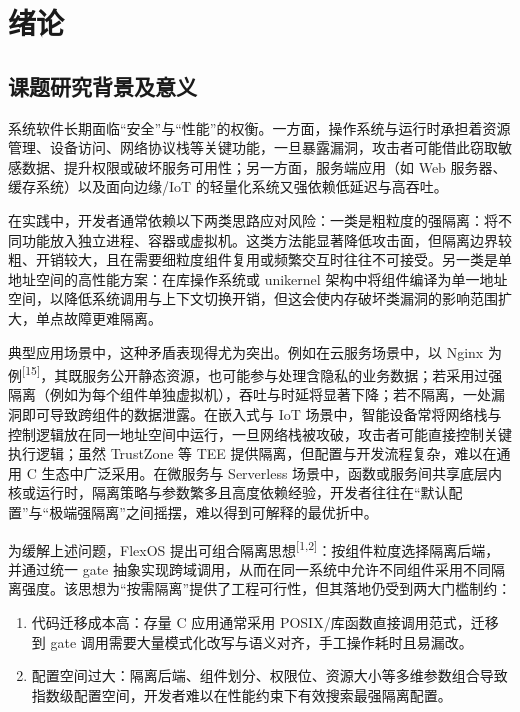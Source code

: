 \documentclass[UTF8,a4paper,12pt]{ctexart}
\numberwithin{equation}{section}
\begin{document}
\section{绪论}

\subsection{课题研究背景及意义}

系统软件长期面临``安全''与``性能''的权衡。一方面，操作系统与运行时承担着资源管理、设备访问、网络协议栈等关键功能，一旦暴露漏洞，攻击者可能借此窃取敏感数据、提升权限或破坏服务可用性；另一方面，服务端应用（如
Web 服务器、缓存系统）以及面向边缘/IoT
的轻量化系统又强依赖低延迟与高吞吐。

在实践中，开发者通常依赖以下两类思路应对风险：一类是粗粒度的强隔离：将不同功能放入独立进程、容器或虚拟机。这类方法能显著降低攻击面，但隔离边界较粗、开销较大，且在需要细粒度组件复用或频繁交互时往往不可接受。另一类是单地址空间的高性能方案：在库操作系统或
unikernel
架构中将组件编译为单一地址空间，以降低系统调用与上下文切换开销，但这会使内存破坏类漏洞的影响范围扩大，单点故障更难隔离。

典型应用场景中，这种矛盾表现得尤为突出。例如在云服务场景中，以 Nginx
为例\textsuperscript{[15]}，其既服务公开静态资源，也可能参与处理含隐私的业务数据；若采用过强隔离（例如为每个组件单独虚拟机），吞吐与时延将显著下降；若不隔离，一处漏洞即可导致跨组件的数据泄露。在嵌入式与
IoT
场景中，智能设备常将网络栈与控制逻辑放在同一地址空间中运行，一旦网络栈被攻破，攻击者可能直接控制关键执行逻辑；虽然
TrustZone 等 TEE 提供隔离，但配置与开发流程复杂，难以在通用 C
生态中广泛采用。在微服务与 Serverless
场景中，函数或服务间共享底层内核或运行时，隔离策略与参数繁多且高度依赖经验，开发者往往在``默认配置''与``极端强隔离''之间摇摆，难以得到可解释的最优折中。

为缓解上述问题，FlexOS
提出可组合隔离思想\textsuperscript{[1,2]}：按组件粒度选择隔离后端，并通过统一
gate
抽象实现跨域调用，从而在同一系统中允许不同组件采用不同隔离强度。该思想为``按需隔离''提供了工程可行性，但其落地仍受到两大门槛制约：
\begin{enumerate}
\def\labelenumi{\arabic{enumi}.}
\item
  代码迁移成本高：存量 C 应用通常采用
  POSIX/库函数直接调用范式，迁移到 gate
  调用需要大量模式化改写与语义对齐，手工操作耗时且易漏改。
\item
  配置空间过大：隔离后端、组件划分、权限位、资源大小等多维参数组合导致指数级配置空间，开发者难以在性能约束下有效搜索最强隔离配置。
\end{enumerate}
\end{document}
